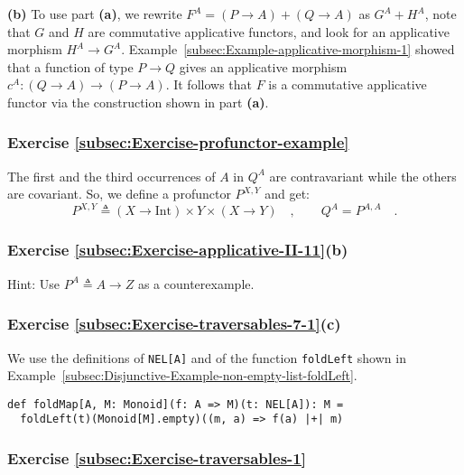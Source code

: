 \textbf{(b)} To use part \textbf{(a)}, we rewrite $F^{A}=(P\rightarrow A)+(Q\rightarrow A)$
as $G^{A}+H^{A}$, note that $G$ and $H$ are commutative applicative
functors, and look for an applicative morphism $H^{A}\rightarrow G^{A}$.
Example~\ref{subsec:Example-applicative-morphism-1} showed that
a function of type $P\rightarrow Q$ gives an applicative morphism
$c^{A}:(Q\rightarrow A)\rightarrow(P\rightarrow A)$. It follows that
$F$ is a commutative applicative functor via the construction shown
in part \textbf{(a)}.

\subsubsection*{Exercise \ref{subsec:Exercise-profunctor-example}}

The first and the third occurrences of $A$ in $Q^{A}$ are contravariant
while the others are covariant. So, we define a profunctor $P^{X,Y}$
and get:
\[
P^{X,Y}\triangleq\left(X\rightarrow\text{Int}\right)\times Y\times\left(X\rightarrow Y\right)\quad,\quad\quad Q^{A}=P^{A,A}\quad.
\]


\subsubsection*{Exercise \ref{subsec:Exercise-applicative-II-11}(b)}

Hint: Use $P^{A}\triangleq A\rightarrow Z$ as a counterexample.


\subsubsection*{Exercise \ref{subsec:Exercise-traversables-7-1}(c)}

We use the definitions of \lstinline!NEL[A]! and of the function
\lstinline!foldLeft! shown in Example~\ref{subsec:Disjunctive-Example-non-empty-list-foldLeft}.
\begin{lstlisting}
def foldMap[A, M: Monoid](f: A => M)(t: NEL[A]): M =
  foldLeft(t)(Monoid[M].empty)((m, a) => f(a) |+| m)
\end{lstlisting}


\subsubsection*{Exercise \ref{subsec:Exercise-traversables-1}}


